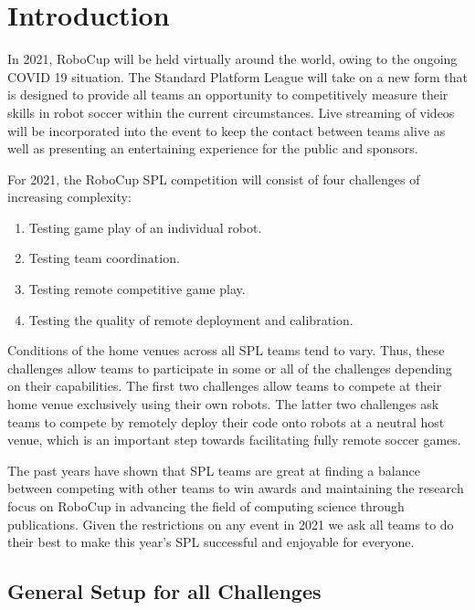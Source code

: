 \section{Introduction}

In 2021, RoboCup will be held virtually around the world, owing to the ongoing COVID 19 situation. The Standard Platform League will take on a new form that is designed to provide all teams an opportunity to competitively measure their skills in robot soccer within the current circumstances. 
Live streaming of videos will be incorporated into the event to keep the contact between teams alive as well as presenting an entertaining experience for the public and sponsors.

For 2021, the RoboCup SPL competition will consist of four challenges of increasing complexity:

\begin{enumerate}
    \item Testing game play of an individual robot. 
    \item Testing team coordination.
    \item Testing remote competitive game play. 
    \item Testing the quality of remote deployment and calibration.
\end{enumerate}

Conditions of the home venues across all SPL teams tend to vary. Thus, these challenges allow teams to participate in some or all of the challenges depending on their capabilities. The first two challenges allow teams to compete at their home venue exclusively using their own robots. The latter two challenges ask teams to compete by remotely deploy their code onto robots at a neutral host venue, which is an important step towards facilitating fully remote soccer games.

The past years have shown that SPL teams are great at finding a balance between competing with other teams to win awards and maintaining the research focus on RoboCup in advancing the field of computing science through publications. Given the restrictions on any event in 2021 we ask all teams to do their best to make this year's SPL successful and enjoyable for everyone. 

\subsection{General Setup for all Challenges}

